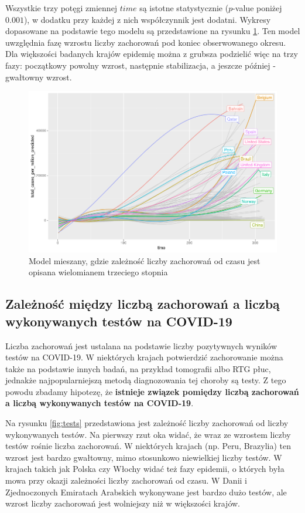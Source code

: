 \documentclass[12pt]{mwbk}
\theoremstyle{plain}
\theoremstyle{definition}
\theoremstyle{definition}
\begin{document}
\newpage

Wszystkie trzy potęgi zmiennej $time$ są istotne statystycznie ($p$-value poniżej $0.001$), w dodatku przy każdej z nich współczynnik jest dodatni. Wykresy dopasowane na podstawie tego modelu są przedstawione na rysunku \ref{fig:mod1_poly_predict}. Ten model uwzględnia fazę wzrostu liczby zachorowań pod koniec obserwowanego okresu. Dla większości badanych krajów epidemię można z grubsza podzielić więc na trzy fazy: początkowy powolny wzrost, następnie stabilizacja, a jeszcze później - gwałtowny wzrost.

\begin{figure}[!h]
	\centering
	\includegraphics[width=\linewidth]{rys/mod1_poly_predict.png}
	
	\caption{Model mieszany, gdzie zależność liczby zachorowań od czasu jest opisana wielomianem trzeciego stopnia}
	\label{fig:mod1_poly_predict}
\end{figure}

\subsection{Zależność między liczbą zachorowań a liczbą wykonywanych testów na COVID-19}

Liczba zachorowań jest ustalana na podstawie liczby pozytywnych wyników testów na COVID-19. W niektórych krajach potwierdzić zachorowanie można także na podstawie innych badań, na przykład tomografii albo RTG płuc, jednakże najpopularniejszą metodą diagnozowania tej choroby są testy. Z tego powodu zbadamy hipotezę, że \textbf{istnieje związek pomiędzy liczbą zachorowań a liczbą wykonywanych testów na COVID-19}.

Na rysunku \ref{fig:tests} przedstawiona jest zależność liczby zachorowań od liczby wykonywanych testów. Na pierwszy rzut oka widać, że wraz ze wzrostem liczby testów rośnie liczba zachorowań. W niektórych krajach (np. Peru, Brazylia) ten wzrost jest bardzo gwałtowny, mimo stosunkowo niewielkiej liczby testów. W krajach takich jak Polska czy Włochy widać też fazy epidemii, o których była mowa przy okazji zależności liczby zachorowań od czasu. W Danii i Zjednoczonych Emiratach Arabskich wykonywane jest bardzo dużo testów, ale wzrost liczby zachorowań jest wolniejszy niż w większości krajów.
\end{document}
